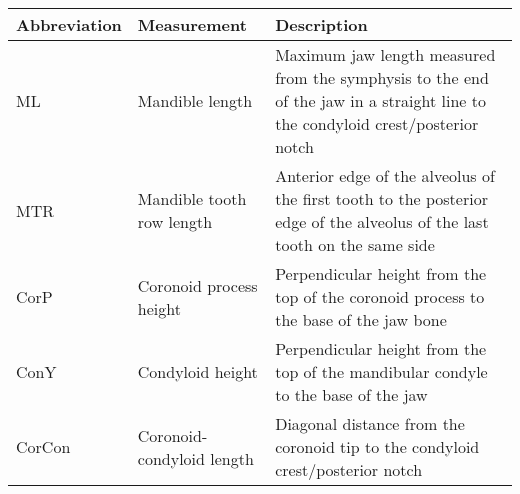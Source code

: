 
\begin{tabular}{p{}p{}p{}}
\hline
\textbf{Abbreviation} & \textbf{Measurement} & \textbf{Description}\\
\hline
ML & Mandible length & Maximum jaw length measured from the symphysis to the end of the jaw in a straight line to the condyloid crest/posterior notch\\
MTR & Mandible tooth row length & Anterior edge of the alveolus of the first tooth to the posterior edge of the alveolus of the last tooth on the same side\\
CorP & Coronoid process height & Perpendicular height from the top of the coronoid process to the base of the jaw bone\\
ConY & Condyloid height & Perpendicular height from the top of the mandibular condyle to the base of the jaw\\
CorCon & Coronoid-condyloid length & Diagonal distance from the coronoid tip to the condyloid crest/posterior notch \citep{Carraway1996}\\
\hline
\end{tabular}